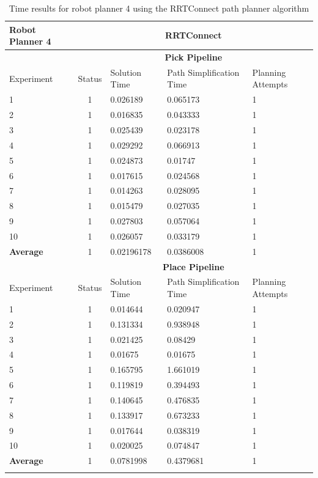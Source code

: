 \begin{longtable}{|p{2cm}|c|p{3cm}|p{3cm}|p{3cm}|}
\hline
Robot Planner 4           & \multicolumn{4}{c}{\textbf{RRTConnect}}                                                                                                 \vline \\
\hline
                          & \multicolumn{4}{c}{\textbf{Pick Pipeline}}                     \vline \\
\hline
Experiment                & Status & Solution Time & Path Simplification Time & Planning Attempts  \\
\hline
1 & 1 & 0.026189 & 0.065173 & 1 \\
2 & 1 & 0.016835 & 0.043333 & 1 \\
3 & 1 & 0.025439 & 0.023178 & 1 \\
4 & 1 & 0.029292 & 0.066913 & 1 \\
5 & 1 & 0.024873 & 0.01747 & 1 \\
6 & 1 & 0.017615 & 0.024568 & 1 \\
7 & 1 & 0.014263 & 0.028095 & 1 \\
8 & 1 & 0.015479 & 0.027035 & 1 \\
9 & 1 & 0.027803 & 0.057064 & 1 \\
10 & 1 & 0.026057 & 0.033179 & 1 \\
\hline
\textbf{Average} & 1	& 0.02196178	& 0.0386008	& 1 \\
\hline
                          & \multicolumn{4}{c}{\textbf{Place Pipeline}}                     \vline \\
\hline
Experiment                & Status & Solution Time & Path Simplification Time & Planning Attempts  \\
\hline
1 & 1 & 0.014644 & 0.020947 & 1 \\
2 & 1 & 0.131334 & 0.938948 & 1 \\
3 & 1 & 0.021425 & 0.08429 & 1 \\
4 & 1 & 0.01675 & 0.01675 & 1 \\
5 & 1 & 0.165795 & 1.661019 & 1 \\
6 & 1 & 0.119819 & 0.394493 & 1 \\
7 & 1 & 0.140645 & 0.476835 & 1 \\
8 & 1 & 0.133917 & 0.673233 & 1 \\
9 & 1 & 0.017644 & 0.038319 & 1 \\
10 & 1 & 0.020025 & 0.074847 & 1 \\
\hline
\textbf{Average} & 1	& 0.0781998	& 0.4379681	& 1 \\
\hline
\caption{Time results for robot planner 4 using the RRTConnect path planner algorithm}
\label{robot-planner4-rrtconnect-data}
\end{longtable}

